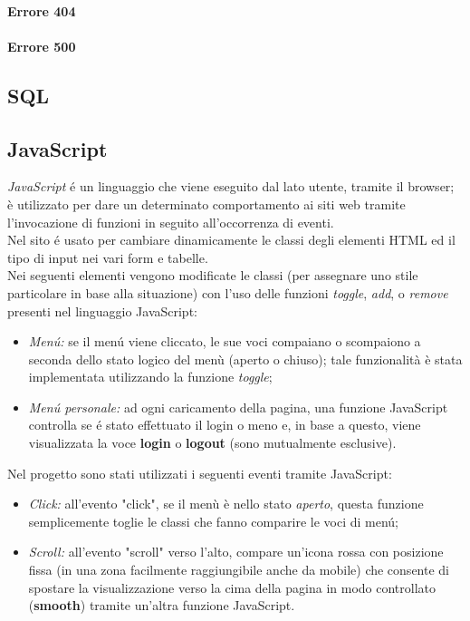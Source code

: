 \documentclass[]{article}
\begin{document}
\paragraph*{Errore 404}
\paragraph*{Errore 500}
\subsection{SQL}	%
\subsection{JavaScript} %
\textit{JavaScript} é un linguaggio che viene eseguito dal lato utente, tramite il browser; è utilizzato per dare un determinato comportamento ai siti web tramite l'invocazione di funzioni in seguito all'occorrenza di eventi.\\
Nel sito é usato per cambiare dinamicamente le classi degli elementi HTML ed il tipo di input nei vari form e tabelle.\\
Nei seguenti elementi vengono modificate le classi (per assegnare uno stile particolare in base alla situazione) con l'uso delle funzioni \textit{toggle}, \textit{add}, o \textit{remove} presenti nel linguaggio JavaScript:
\begin{itemize}
        \item \textit{Menú:} se il menú viene cliccato, le sue voci compaiano o scompaiono a seconda dello stato logico del menù (aperto o chiuso); tale funzionalità è stata implementata utilizzando la funzione \textit{toggle};
        \item \textit{Menú personale:} ad ogni caricamento della pagina, una funzione JavaScript controlla se é stato effettuato il login o meno e, in base a questo, viene visualizzata la voce \textbf{login} o \textbf{logout} (sono mutualmente esclusive).
\end{itemize}
Nel progetto sono stati utilizzati i seguenti eventi tramite JavaScript:
\begin{itemize}
        \item \textit{Click:} all'evento "click", se il menù è nello stato \textit{aperto}, questa funzione semplicemente toglie le classi che fanno comparire le voci di menú;
        \item \textit{Scroll:} all'evento "scroll" verso l'alto, compare un'icona rossa con posizione fissa (in una zona facilmente raggiungibile anche da mobile) che consente di spostare la visualizzazione verso la cima della pagina in modo controllato (\textbf{smooth}) tramite un'altra funzione JavaScript.
\end{itemize}
\end{document}
